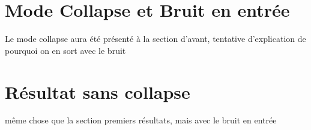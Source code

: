\section{Mode Collapse et Bruit en entrée}

{Le mode collapse aura été présenté à la section d'avant, tentative d'explication de pourquoi on en sort avec le bruit}

\section{Résultat sans collapse}
{même chose que la section premiers résultats, mais avec le bruit en entrée}

